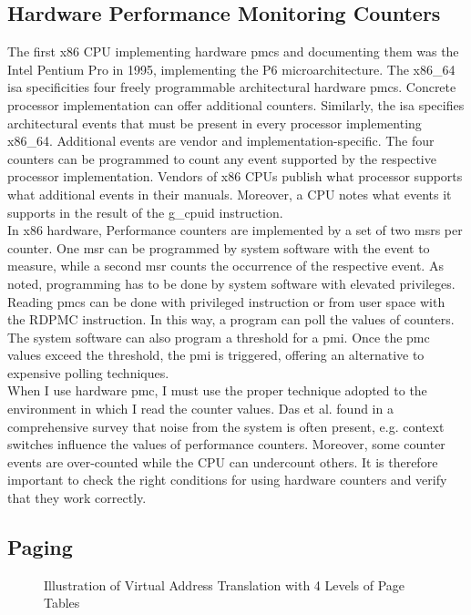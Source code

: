 \subsection{Hardware Performance Monitoring Counters}
\label{sec:state:technical:hpc}
The first x86 CPU implementing hardware \glspl{pmc} and
documenting them was the Intel Pentium Pro in 1995, implementing the P6
microarchitecture.\cite{intel_sdm} The x86\_64 \gls{isa} specificities
four freely programmable architectural hardware
\glspl{pmc}.\cite{amd_manual} Concrete processor implementation can offer
additional counters. Similarly, the \gls{isa} specifies architectural
events that must be present in every processor implementing x86\_64. Additional
events are vendor and implementation-specific. The four counters can be
programmed to count any event supported by the respective processor
implementation. Vendors of x86 CPUs publish what processor supports what
additional events in their manuals. Moreover, a CPU notes what events it
supports in the result of the \gls{g_cpuid} instruction. \\

In x86 hardware, Performance counters are implemented by a set of two
\glspl{msr} per counter. One \gls{msr} can be programmed by system software with
the event to measure, while a second \gls{msr} counts the occurrence of the
respective event. As noted, programming has to be done by system software with
elevated privileges. Reading \glspl{pmc} can be done with privileged instruction
or from user space with the RDPMC instruction. In this way, a program can poll
the values of counters. The system software can also program a threshold for a
\gls{pmi}. Once the \gls{pmc} values exceed the threshold, the \gls{pmi} is
triggered, offering an alternative to expensive polling techniques.\\

When I use hardware \gls{pmc}, I must use the proper technique adopted to
the environment in which I read the counter values. Das et al. found in a
comprehensive survey that noise from the system is often present, e.g. context
switches influence the values of performance counters. \cite{das_sok_2019}
Moreover, some counter events are over-counted while the CPU can undercount
others.\cite{weaver_non-determinism_2013} It is therefore important to check the
right conditions for using hardware counters and verify that they work
correctly.

\subsection{Paging}
\label{sec:state:technical:paging}
\begin{center}
    \begin{figure}
        \centering
        
        \caption{Illustration of Virtual Address Translation with 4 Levels of Page Tables}
        \label{fig:state:technical:paging}
    \end{figure}
\end{center}

